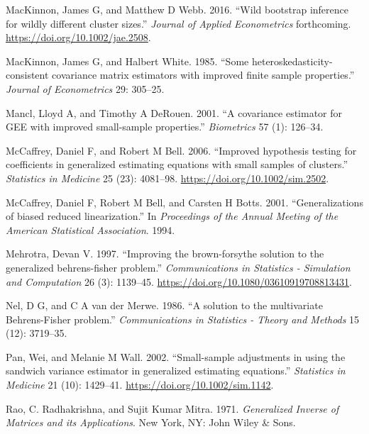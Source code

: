 \documentclass[12pt]{article}
\newlength{\cslhangindent}
\newlength{\cslentryspacingunit} %
\newenvironment{CSLReferences}[2] %
 {%
  \setlength{\parindent}{0pt}
  \ifodd #1
  \let\oldpar\par
  \def\par{\hangindent=\cslhangindent\oldpar}
  \fi
  \setlength{\parskip}{#2\cslentryspacingunit}
 }%
 {}
\begin{document}
\begin{CSLReferences}{1}{0}
\leavevmode{}%
MacKinnon, James G, and Matthew D Webb. 2016. {``{Wild bootstrap
inference for wildly different cluster sizes}.''} \emph{Journal of
Applied Econometrics} forthcoming.
\url{https://doi.org/10.1002/jae.2508}.

\leavevmode{}%
MacKinnon, James G, and Halbert White. 1985. {``{Some
heteroskedasticity-consistent covariance matrix estimators with improved
finite sample properties}.''} \emph{Journal of Econometrics} 29:
305--25.

\leavevmode{}%
Mancl, Lloyd A, and Timothy A DeRouen. 2001. {``{A covariance estimator
for GEE with improved small-sample properties}.''} \emph{Biometrics} 57
(1): 126--34.

\leavevmode{}%
McCaffrey, Daniel F, and Robert M Bell. 2006. {``{Improved hypothesis
testing for coefficients in generalized estimating equations with small
samples of clusters.}''} \emph{Statistics in Medicine} 25 (23):
4081--98. \url{https://doi.org/10.1002/sim.2502}.

\leavevmode{}%
McCaffrey, Daniel F, Robert M Bell, and Carsten H Botts. 2001.
{``{Generalizations of biased reduced linearization}.''} In
\emph{Proceedings of the Annual Meeting of the American Statistical
Association}. 1994.

\leavevmode{}%
Mehrotra, Devan V. 1997. {``{Improving the brown-forsythe solution to
the generalized behrens-fisher problem}.''} \emph{Communications in
Statistics - Simulation and Computation} 26 (3): 1139--45.
\url{https://doi.org/10.1080/03610919708813431}.

\leavevmode{}%
Nel, D G, and C A van der Merwe. 1986. {``{A solution to the
multivariate Behrens-Fisher problem}.''} \emph{Communications in
Statistics - Theory and Methods} 15 (12): 3719--35.

\leavevmode{}%
Pan, Wei, and Melanie M Wall. 2002. {``{Small-sample adjustments in
using the sandwich variance estimator in generalized estimating
equations.}''} \emph{Statistics in Medicine} 21 (10): 1429--41.
\url{https://doi.org/10.1002/sim.1142}.

\leavevmode{}%
Rao, C. Radhakrishna, and Sujit Kumar Mitra. 1971. \emph{{Generalized
Inverse of Matrices and its Applications}}. New York, NY: John Wiley \&
Sons.


\end{CSLReferences}
\end{document}
